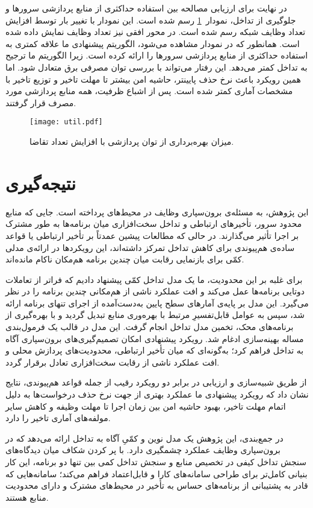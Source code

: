 در نهایت برای ارزیابی مصالحه بین استفاده حداکثری از منابع پردازشی سرورها و جلوگیری از تداخل، نمودار~\ref{figure:util_plot} رسم شده است. این نمودار با تغییر بار توسط افزایش تعداد وظایف شبکه رسم شده است. در محور افقی نیز تعداد وظایف نمایش داده شده است. همانطور که در نمودار مشاهده می‌شود، الگوریتم پیشنهادی ما علاقه کمتری به استفاده حداکثری از منابع پردازشی سرورها را ارائه کرده است. زیرا الگوریتم ما ترجیح به تداخل کمتر می‌دهد. این رفتار می‌تواند با بررسی توان مصرفی برق متعادل شود. اما همین رویکرد باعث نرخ حذف پایینتر، حاشیه امن بیشتر تا مهلت تاخیر و توزیع تاخیر با مشخصات آماری کمتر شده است. پس از اشباع ظرفیت، همه منابع پردازشی مورد مصرف قرار گرفتند.

\vspace{0.5cm}
\begin{figure}[h]
\centering
\texttt{[image: util.pdf]}
\caption{میزان بهره‌برداری از توان پردازشی با افزایش تعداد تقاضا.}
\label{figure:util_plot}
\end{figure}
\vspace{0.5cm}

\section{نتیجه‌گیری}
این پژوهش، به مسئله‌ی برون‌سپاری وظایف در محیط‌های  پرداخته است. جایی که منابع محدود سرور، تأخیرهای ارتباطی و تداخل سخت‌افزاری میان برنامه‌ها به طور مشترک بر اجرا تأثیر می‌گذارند. در حالی که مطالعات پیشین عمدتاً بر تأخیر ارتباطی یا قواعد ساده‌ی هم‌پیوندی برای کاهش تداخل تمرکز داشته‌اند، این رویکردها در ارائه‌ی مدلی کمّی برای بازنمایی رقابت میان چندین برنامه هم‌مکان ناکام مانده‌اند. 

برای غلبه بر این محدودیت، ما یک مدل تداخل کمّی پیشنهاد دادیم که فراتر از تعاملات دوتایی برنامه‌ها عمل می‌کند و افت عملکرد ناشی از هم‌مکانی چندین برنامه را در نظر می‌گیرد. این مدل بر پایه‌ی آمارهای سطح پایین به‌دست‌آمده از اجرای تنهای برنامه ارائه شد، سپس به عوامل قابل‌تفسیرِ مرتبط با بهره‌وری منابع تبدیل گردید و با بهره‌گیری از برنامه‌های محک، تخمین مدل تداخل انجام گرفت. این مدل در قالب یک فرمول‌بندی مساله بهینه‌سازی ادغام شد. رویکرد پیشنهادی امکان تصمیم‌گیری‌های برون‌سپاری آگاه به تداخل فراهم کرد؛ به‌گونه‌ای که میان تأخیر ارتباطی، محدودیت‌های پردازش محلی و افت عملکرد ناشی از رقابت سخت‌افزاری تعادل برقرار گردد.

از طریق شبیه‌سازی و ارزیابی در برابر دو رویکرد رقیب از جمله قواعد هم‌پیوندی، نتایج نشان داد که رویکرد پیشنهادی ما عملکرد بهتری از جهت نرخ حذف درخواست‌ها به دلیل اتمام مهلت تاخیر، بهبود حاشیه امن بین زمان اجرا تا مهلت وظیفه و کاهش سایر مولفه‌های آماری تاخیر را دارد. 

در جمع‌بندی، این پژوهش یک مدل نوین و کمّیِ آگاه به تداخل ارائه می‌دهد که در برون‌سپاری وظایف  عملکرد چشمگیری دارد. با پر کردن شکاف میان دیدگاه‌های سنجش تداخل کیفی در تخصیص منابع و سنجش تداخل کمی بین تنها دو برنامه، این کار بنیانی کامل‌تر برای طراحی سامانه‌های  کارا و قابل‌اعتماد فراهم می‌کند؛ سامانه‌هایی که قادر به پشتیبانی از برنامه‌های حساس به تأخیر در محیط‌های مشترک و دارای محدودیت منابع هستند.